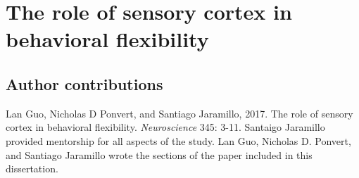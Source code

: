 \newcommand{\Tasks}{5.1}
\newcommand{\StimOutcome}{\Tasks A}
\newcommand{\StimAction}{\Tasks B}
\newcommand{\FeatureRelevance}{\Tasks C}

\newcommand{\Mechanisms}{5.2}
\newcommand{\LTP}{\Tasks A}
\newcommand{\TopDown}{\Tasks A}

\chapter{The role of sensory cortex in behavioral flexibility}

\section{Author contributions}
\noindent Lan Guo, Nicholas D Ponvert, and Santiago Jaramillo, 2017. The role of sensory cortex in behavioral flexibility. \textit{Neuroscience} 345: 3-11. 
%
Santaigo Jaramillo provided mentorship for all aspects of the study. Lan Guo, Nicholas D. Ponvert, and Santiago Jaramillo wrote the sections of the paper included in this dissertation.



